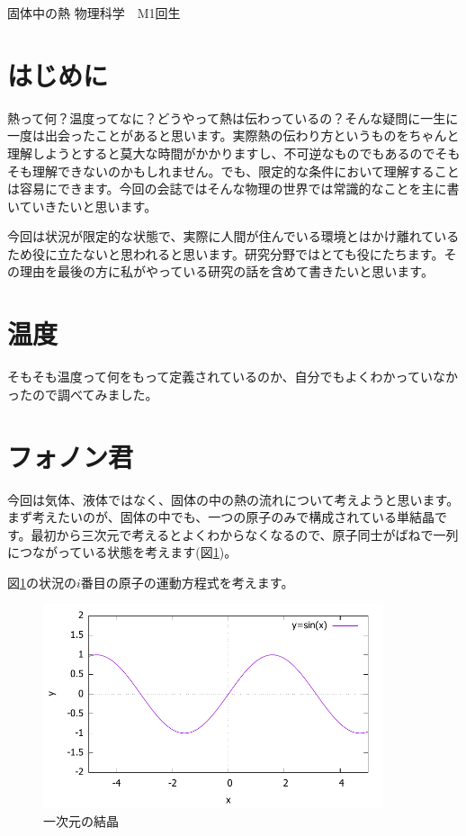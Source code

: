 \documentclass[10pt,b5paper,papersize,dvipdfmx]{jsbook}
\begin{document}


\kaishititle%
  {固体中の熱}%
  {物理科学　M1回生}%
  {}%

\section*{はじめに}
熱って何？温度ってなに？どうやって熱は伝わっているの？そんな疑問に一生に一度は出会ったことがあると思います。実際熱の伝わり方というものをちゃんと理解しようとすると莫大な時間がかかりますし、不可逆なものでもあるのでそもそも理解できないのかもしれません。でも、限定的な条件において理解することは容易にできます。今回の会誌ではそんな物理の世界では常識的なことを主に書いていきたいと思います。\par
今回は状況が限定的な状態で、実際に人間が住んでいる環境とはかけ離れているため役に立たないと思われると思います。研究分野ではとても役にたちます。その理由を最後の方に私がやっている研究の話を含めて書きたいと思います。


%
\section{温度}
そもそも温度って何をもって定義されているのか、自分でもよくわかっていなかったので調べてみました。


\section{フォノン君}
今回は気体、液体ではなく、固体の中の熱の流れについて考えようと思います。まず考えたいのが、固体の中でも、一つの原子のみで構成されている単結晶です。最初から三次元で考えるとよくわからなくなるので、原子同士がばねで一列につながっている状態を考えます(図\ref{fig:bane})。\par
図\ref{fig:bane}の状況の$i$番目の原子の運動方程式を考えます。
\begin{figure}[htbp]
  \centering
  \includegraphics[width=10cm]{temp/fig-sin.pdf}
  \caption{一次元の結晶}
  \label{fig:bane}
\end{figure}
\end{document}
